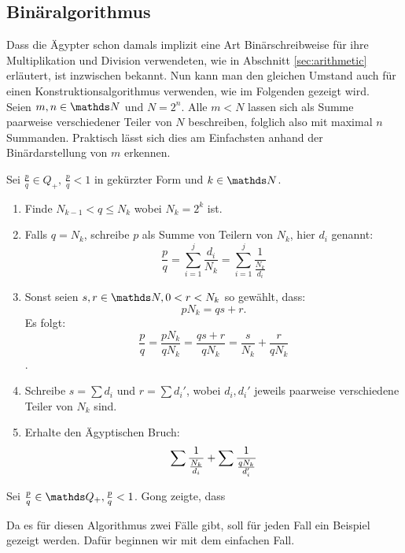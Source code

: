 \subsection{Binäralgorithmus}

Dass die Ägypter schon damals implizit eine Art Binärschreibweise für ihre Multiplikation und Division verwendeten, wie in Abschnitt \ref{sec:arithmetic} erläutert, ist inzwischen bekannt. Nun kann man den gleichen Umstand auch für einen Konstruktionsalgorithmus verwenden, wie im Folgenden gezeigt wird.\\
Seien $m, n \in \N$ und $N = 2^n$. Alle $m < N$ lassen sich als Summe paarweise verschiedener Teiler von $N$ beschreiben, folglich also mit maximal $n$ Summanden. Praktisch lässt sich dies am Einfachsten anhand der Binärdarstellung von $m$ erkennen.

\begin{algorithm}\label{algo:binary}
	Sei $\frac{p}{q} \in Q_+, \, \frac{p}{q} < 1$ in gekürzter Form und $k \in \N$.
	\begin{enumerate}
		\item Finde $N_{k-1} < q \leq N_k$ wobei $N_k=2^k$ ist.
		\item Falls $q = N_k$, schreibe $p$ als Summe von Teilern von $N_k$, hier $d_i$ genannt:
		$$\frac{p}{q} = \sum_{i=1}^{j} \frac{d_i}{N_k}=  \sum_{i = 1}^{j}\frac{1}{\frac{N_k}{d_i}}$$
		\item Sonst seien $s, r \in \N, 0 < r < N_k$ so gewählt, dass:
		$$pN_k = qs+r.$$
		Es folgt:
		$$\frac{p}{q} = \frac{p N_k}{q N_k} = \frac{qs + r}{q N_k} = \frac{s}{N_k} + \frac{r}{q N_k}$$.
		\item Schreibe $s = \sum d_i$ und $r = \sum d_i'$, wobei $d_i, d_i'$ jeweils paarweise verschiedene Teiler von $N_k$ sind.
		\item Erhalte den Ägyptischen Bruch:
		$$\sum \frac{1}{\frac{N_k}{d_i}} + \sum \frac{1}{\frac{q N_k}{d_i'}}$$
	\end{enumerate}
\end{algorithm}

Sei $\frac{p}{q} \in \Q_+, \frac{p}{q} < 1$. Gong zeigte, dass 

Da es für diesen Algorithmus zwei Fälle gibt, soll für jeden Fall ein Beispiel gezeigt werden. Dafür beginnen wir mit dem einfachen Fall.

